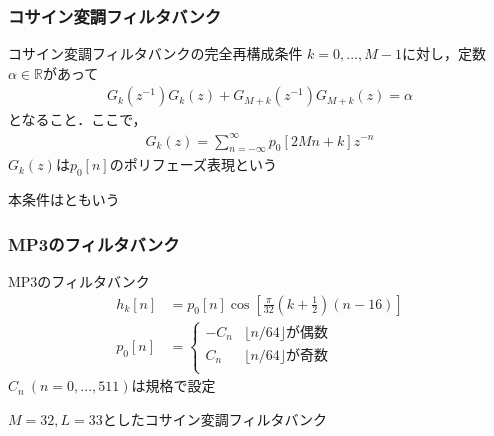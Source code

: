 \documentclass[14pt,xcolor=dvipsnames,table,dvipdfmx]{beamer}
\begin{document}
\begin{frame}[c]
    \frametitle{コサイン変調フィルタバンク}
    \begin{block}{コサイン変調フィルタバンクの完全再構成条件}
        $k = 0, ..., M-1$に対し，定数$\alpha \in \mathbb{R}$があって
        \begin{align}
            G_{k}(z^{-1}) G_{k}(z) + G_{M + k}(z^{-1}) G_{M + k}(z) = \alpha
        \end{align}
        となること．ここで，
        \begin{align}
            G_{k}(z) = \sum_{n = -\infty}^{\infty} p_{0}[2Mn + k] z^{-n} \label{eq:polyphase_representation_of_prototype}
        \end{align}
        $G_{k}(z)$は$p_{0}[n]$のポリフェーズ表現という
    \end{block}
    本条件はともいう
\end{frame}

\begin{frame}[c]
    \frametitle{MP3のフィルタバンク}
    \begin{block}{MP3のフィルタバンク}
        \vspace{-10pt}
        \begin{align}
            h_{k}[n] &= p_{0}[n] \cos\left[ \frac{\pi}{32}\left( k + \frac{1}{2} \right) \left( n - 16 \right) \right] \\
            p_{0}[n] &= \left\{ \begin{array}{ll}
                -C_{n} & \lfloor n / 64 \rfloor \text{が偶数} \\
                C_{n} & \lfloor n / 64 \rfloor \text{が奇数} \\
            \end{array} \right.
        \end{align}
        $C_{n}\ (n = 0,...,511)$は規格で設定
    \end{block}
    $M = 32, L = 33$としたコサイン変調フィルタバンク
\end{frame}
\end{document}
